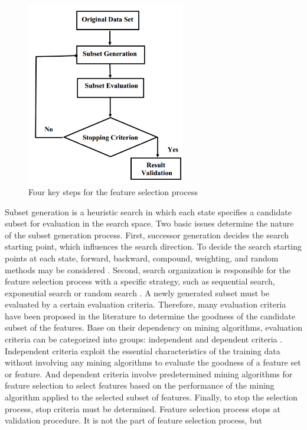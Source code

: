 \documentclass[document.tex]{subfiles}
\begin{document}
\begin{figure}[H]
	\begin{center}
		\includegraphics[height=8.0cm]{imgs/Feature_mining3.png}
	\end{center}
	\caption{Four key steps for the feature selection process}
	\label{fig:Four key steps for the feature selection process}
\end{figure}
\noindent Subset generation is a heuristic search in which each state specifies a candidate subset
for evaluation in the search space. Two basic issues determine the nature of the subset
generation process. First, successor generation decides the search starting point, which
influences the search direction. To decide the search starting points at each state, forward,
backward, compound, weighting, and random methods may be considered . Second,
search organization is responsible for the feature selection process with a specific strategy,
such as sequential search, exponential search or random search . A newly generated subset
must be evaluated by a certain evaluation criteria. Therefore, many evaluation criteria
have been proposed in the literature to determine the goodness of the candidate subset
of the features. Base on their dependency on mining algorithms, evaluation criteria can
be categorized into groups: independent and dependent criteria . Independent criteria
exploit the essential characteristics of the training data without involving any mining
algorithms to evaluate the goodness of a feature set or feature. And dependent criteria
involve predetermined mining algorithms for feature selection to select features based
on the performance of the mining algorithm applied to the selected subset of features.
Finally, to stop the selection process, stop criteria must be determined. Feature selection
process stops at validation procedure. It is not the part of feature selection process, but
\end{document}
